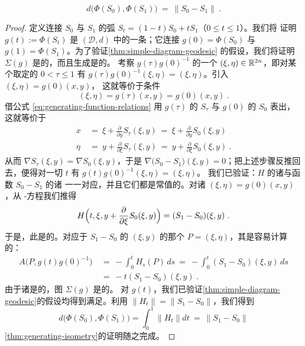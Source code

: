 \begin{theorem}\label{thm:generating-isometry}
\[
d\bigl(\varPhi(S_{0}),\varPhi(S_{1})\bigr)\ =\ \lVert S_{0}-S_{1}\rVert\ .
\]
\end{theorem}

\begin{proof}
定义连接 $S_{0}$ 与 $S_{1}$ 的弧 $S_{t}=(1-t)S_{0}+tS_{1}$（$0\leq t\leq1$）。我们将%
证明\trPath{} $g(t):=\varPhi(S_{t})$ 是 $(\mathcal{D},d)$ 中的一条\trMinimal\trGeodesic；它连接%
$g(0)=\varPhi(S_{0})$ 与 $g(1)=\varPhi(S_{1})$。为了验证\cref{thm:simple-diagram-geodesic}%
的假设，我们将证明 $\Sigma(g)$ 是\trSimple{}的，而且生成\trHamiltonianFunction{}是\trQuasiAutonomous{}的。%
考察 $g(\tau)g(0)^{-1}$ 的一个\trFixedPoint{} $(\xi,\eta)\in\mathbb{R}^{2n}$，即对某个取定的%
$0<\tau\leq1$ 有 $g(\tau)g(0)^{-1}(\xi,\eta)=(\xi,\eta)$。引入 $(\xi,\eta)=g(0)(x,y)$，%
这就等价于条件
\[
(\xi,\eta)=g(\tau)(x,y)=g(0)(x,y)\ .
\]
借公式 \eqref{eq:generating-function-relations} 用 $g(\tau)$ 的\trGeneratingFunction{} $S_{\tau}$ 与%
$g(0)$ 的\trGeneratingFunction{} $S_{0}$ 表出，这就等价于
\begin{align*}
x\ &=\ \xi+\frac{\partial}{\partial y}S_{\tau}(\xi,y)\ =\ \xi+\frac{\partial}{\partial y}S_{0}(\xi,y)\\
\eta\ &=\ y+\frac{\partial}{\partial \xi}S_{\tau}(\xi,y)\ =\ y+\frac{\partial}{\partial \xi}S_{0}(\xi,y)\ .
\end{align*}
从而 $\nabla S_{\tau}(\xi,y)=\nabla S_{0}(\xi,y)$，于是 $\nabla\bigl(S_{0}-S_{1}\bigr)%
(\xi,y)=0$；把上述步骤反推回去，便得对一切 $t$ 有 $g(t)g(0)^{-1}(\xi,\eta)=(\xi,\eta)$。%
我们已验证：$H$ 的诸\trPeriodicSolution{}与函数 $S_{0}-S_{1}$ 的诸\trCriticalPoint{}%
一一对应，并且它们都是常值的。对诸\trCriticalPoint{} $(\xi,\eta)=g(0)(x,y)$，从%
\trHamilton-\trJacobi{}方程我们推得
\[
H\Bigl(t,\xi,y+\frac{\partial}{\partial\xi}S_{0}(\xi,y)\Bigr)=(S_{1}-S_{0})(\xi,y)\ .
\]
于是，此\trHamiltonianFunction{}是\trQuasiAutonomous{}的。对应于 $S_{1}-S_{0}$ 的\trCriticalPoint{}%
$(\xi,y)$ 的那个\trFixedPoint{} $P=(\xi,\eta)$，其\trAction{}是容易计算的：
\begin{align*}
A\bigl(P,g(t)g(0)^{-1}\bigr)\ &=\ -\int_{0}^{t}H_{s}(P)\,ds\ =\ -\int_{0}^{t}(S_{1}-S_{0})(\xi,y)\,ds\\
&=\ -t(S_{1}-S_{0})(\xi,y)\ .
\end{align*}
由于诸\trCriticalValue{}是\trNowhereDense{}的，\trBifurcation{}图 $\Sigma(g)$ 是\trSimple{}的。%
对\trPath{} $g(t)$，我们已验证\cref{thm:simple-diagram-geodesic}的假设均得到满足。利用%
$\lVert H_{t}\rVert=\lVert S_{1}-S_{0}\rVert$，我们得到
\[
d\bigl(\varPhi(S_{0}),\varPhi(S_{1})\bigr)=\int_{0}^{1}\lVert H_{t}\rVert dt\ =\ %
\lVert S_{1}-S_{0}\rVert
\]
\cref{thm:generating-isometry}的证明随之完成。
\end{proof}


